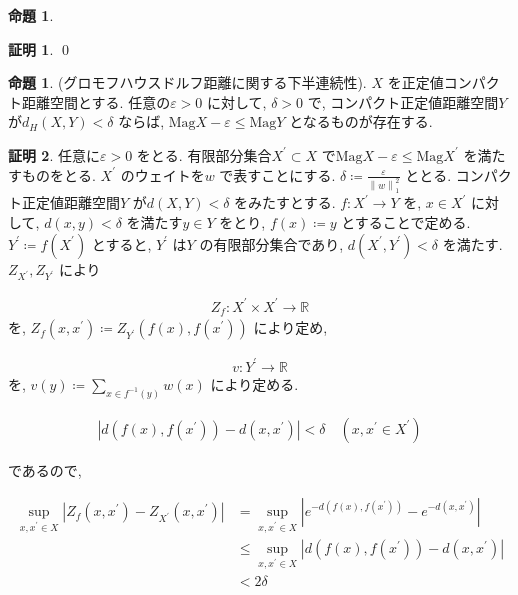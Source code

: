 \documentclass[10pt, fleqn, label-section=none]{bxjsarticle}
\theoremstyle{definition}
\newtheorem{prop}[dfn]{命題}
\newtheorem*{pf*}{証明}
\newcommand{\veps}{\varepsilon}
\newcommand{\abs}[1]{\left|#1\right|}
\newcommand{\norm}[1]{\left\|#1\right\|}
\renewcommand{\;}{\, ; \,}
\newcommand{\Mag}{\textrm{Mag}}
\begin{document}
\begin{prop}

\end{prop}
\begin{pf*}

\qed
\end{pf*}


\begin{prop}(グロモフハウスドルフ距離に関する下半連続性). $X$ を正定値コンパクト距離空間とする. 任意の$\veps > 0$ に対して, $\delta > 0$ で, コンパクト正定値距離空間$Y$ が$d_H(X, Y) < \delta$ ならば, $\Mag X - \veps \leq \Mag Y$ となるものが存在する. 

\end{prop}
\begin{pf*}
任意に$\veps > 0$ をとる. 有限部分集合$X^\prime \subset X$ で$\Mag X - \veps \leq \Mag X ^\prime$ を満たすものをとる. $X^\prime$ のウェイトを$w$ で表すことにする. $\delta \coloneqq \frac{\veps}{ \norm{w}_1^2}$ ととる. コンパクト正定値距離空間$Y$ が$d(X, Y) < \delta$ をみたすとする. $f: X^\prime \rightarrow Y$ を, $x \in X^\prime$ に対して, $d(x, y) < \delta$ を満たす$y \in Y$ をとり, $f(x) \coloneqq y$ とすることで定める. $Y^\prime \coloneqq f(X^\prime)$ とすると, $Y^\prime$ は$Y$ の有限部分集合であり, $d(X^\prime , Y^\prime) < \delta $ を満たす. $Z_{X^\prime}, Z_{Y^\prime}$ により

\begin{align*} Z_f : X^\prime \times X^\prime \rightarrow \mathbb R\end{align*}
を, $Z_f (x, x^\prime ) \coloneqq Z_{Y^\prime}(f(x), f(x^\prime))$ により定め, 

\begin{align*} v: Y^\prime \rightarrow \mathbb R \end{align*}
を, $v(y) \coloneqq \sum_{x \in f^{-1}(y)} w(x)$ により定める. 

\begin{align*} \abs{d(f(x), f(x^\prime)) - d(x, x^\prime)} < \delta \quad (x, x^\prime \in X^\prime) \end{align*}

であるので, 

\begin{align*}\sup_{x, x^\prime \in X} \abs{Z_f(x, x^\prime) - Z_{X^\prime}(x, x^\prime)} 
&= \sup_{x, x^\prime \in X} \abs{e^{-d(f(x), f(x^\prime))} - e^{-d(x, x^\prime)} } 
\\&\leq \sup_{x, x^\prime \in X} \abs{d(f(x), f(x^\prime)) - d(x, x^\prime)} \\&< 2 \delta \end{align*}


\end{pf*}
\end{document}
